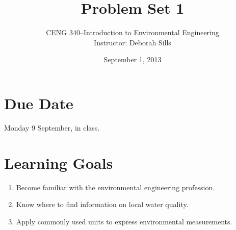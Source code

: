 \documentclass[12pt,letterpaper]{article}
\begin{document}
\setlength{\parindent}{0cm} 


\frenchspacing

\title {Problem Set 1} 
\author {CENG 340--Introduction to Environmental Engineering\\
Instructor: Deborah Sills}
\date {September 1, 2013}
\maketitle

\section *{Due Date}
Monday 9 September, in class.

\section *{Learning Goals}
\begin{enumerate}
\item Become familiar with the environmental engineering profession.
\item Know where to find information on local water quality.
\item Apply commonly used units to express environmental measurements.
\end{enumerate}
\end{document}
